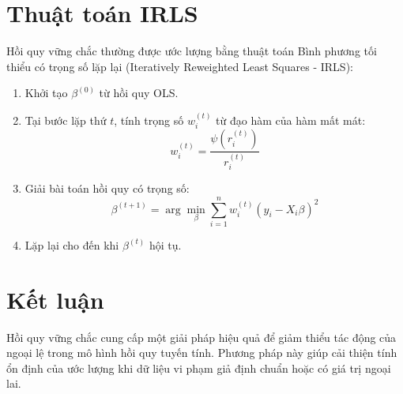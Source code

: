 \section{Thuật toán IRLS}
Hồi quy vững chắc thường được ước lượng bằng thuật toán Bình phương tối thiểu có trọng số lặp lại (Iteratively Reweighted Least Squares - IRLS):
\begin{enumerate}
    \item Khởi tạo $\beta^{(0)}$ từ hồi quy OLS.
    \item Tại bước lặp thứ $t$, tính trọng số $w_i^{(t)}$ từ đạo hàm của hàm mất mát:
    \begin{equation}
        w_i^{(t)} = \frac{\psi(r_i^{(t)})}{r_i^{(t)}}
    \end{equation}
    \item Giải bài toán hồi quy có trọng số:
    \begin{equation}
        \beta^{(t+1)} = \arg \min_{\beta} \sum_{i=1}^{n} w_i^{(t)} (y_i - X_i \beta)^2
    \end{equation}
    \item Lặp lại cho đến khi $\beta^{(t)}$ hội tụ.
\end{enumerate}

\section{Kết luận}
Hồi quy vững chắc cung cấp một giải pháp hiệu quả để giảm thiểu tác động của ngoại lệ trong mô hình hồi quy tuyến tính. Phương pháp này giúp cải thiện tính ổn định của ước lượng khi dữ liệu vi phạm giả định chuẩn hoặc có giá trị ngoại lai.
